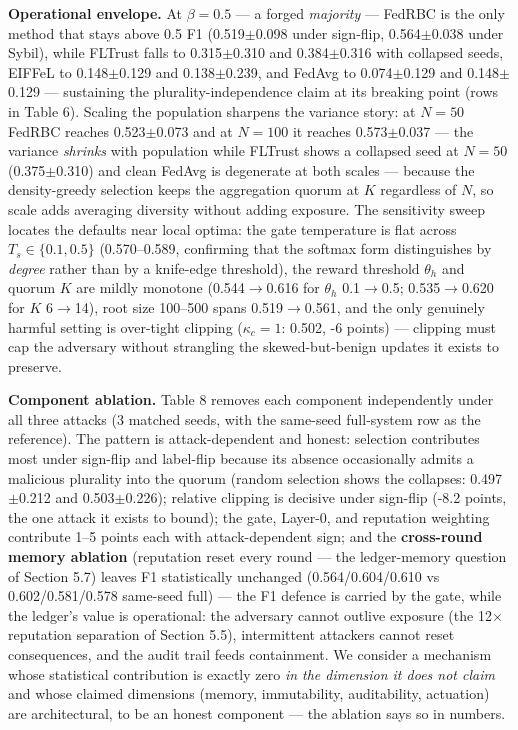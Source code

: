 \documentclass[cmc,article,submit,moreauthors,pdftex]{Definitions/tsp}
\begin{document}
\textbf{Operational envelope.} At $\beta = 0.5$ --- a forged \emph{majority} --- FedRBC is the only method that stays above 0.5 F1 (0.519$\pm$0.098 under sign-flip, 0.564$\pm$0.038 under Sybil), while FLTrust falls to 0.315$\pm$0.310 and 0.384$\pm$0.316 with collapsed seeds, EIFFeL to 0.148$\pm$0.129 and 0.138$\pm$0.239, and FedAvg to 0.074$\pm$0.129 and 0.148$\pm$0.129 --- sustaining the plurality-independence claim at its breaking point (rows in Table 6). Scaling the population sharpens the variance story: at $N=50$ FedRBC reaches 0.523$\pm$0.073 and at $N=100$ it reaches 0.573$\pm$0.037 --- the variance \emph{shrinks} with population while FLTrust shows a collapsed seed at $N=50$ (0.375$\pm$0.310) and clean FedAvg is degenerate at both scales --- because the density-greedy selection keeps the aggregation quorum at $K$ regardless of $N$, so scale adds averaging diversity without adding exposure. The sensitivity sweep locates the defaults near local optima: the gate temperature is flat across $T_s \in \{0.1, 0.5\}$ (0.570--0.589, confirming that the softmax form distinguishes by \emph{degree} rather than by a knife-edge threshold), the reward threshold $\theta_h$ and quorum $K$ are mildly monotone (0.544$\to$0.616 for $\theta_h$ 0.1$\to$0.5; 0.535$\to$0.620 for $K$ 6$\to$14), root size 100--500 spans 0.519$\to$0.561, and the only genuinely harmful setting is over-tight clipping ($\kappa_c=1$: 0.502, -6 points) --- clipping must cap the adversary without strangling the skewed-but-benign updates it exists to preserve.

\textbf{Component ablation.} Table 8 removes each component independently under all three attacks (3 matched seeds, with the same-seed full-system row as the reference). The pattern is attack-dependent and honest: selection contributes most under sign-flip and label-flip because its absence occasionally admits a malicious plurality into the quorum (random selection shows the collapses: 0.497$\pm$0.212 and 0.503$\pm$0.226); relative clipping is decisive under sign-flip (-8.2 points, the one attack it exists to bound); the gate, Layer-0, and reputation weighting contribute 1--5 points each with attack-dependent sign; and the \textbf{cross-round memory ablation} (reputation reset every round --- the ledger-memory question of Section 5.7) leaves F1 statistically unchanged (0.564/0.604/0.610 vs 0.602/0.581/0.578 same-seed full) --- the F1 defence is carried by the gate, while the ledger's value is operational: the adversary cannot outlive exposure (the 12$\times$ reputation separation of Section 5.5), intermittent attackers cannot reset consequences, and the audit trail feeds containment. We consider a mechanism whose statistical contribution is exactly zero \emph{in the dimension it does not claim} and whose claimed dimensions (memory, immutability, auditability, actuation) are architectural, to be an honest component --- the ablation says so in numbers.
\end{document}
